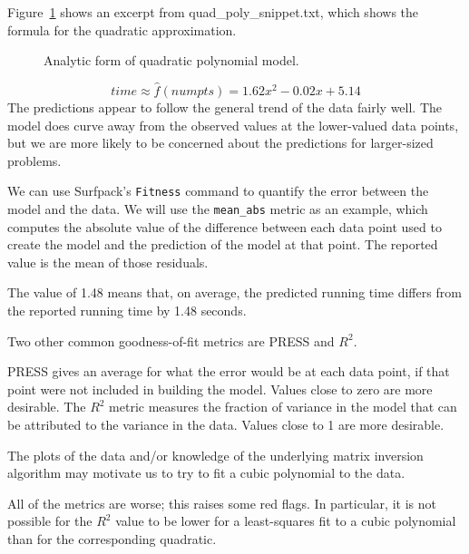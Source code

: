 \documentclass{article}
\begin{document}
Figure~\ref{fig:timing_poly2_extract} shows an excerpt from quad\_poly\_snippet.txt, which shows the
formula for the quadratic approximation.
\begin{figure}[htbp]
  \centering
  \begin{bigbox}
	\begin{small}
	
 	\end{small}
  \end{bigbox}
   \label{fig:timing_poly2_extract}
   \caption{ Analytic form of quadratic polynomial model. }
\end{figure}
\[ time \approx \hat{f}(numpts) = 1.62x^2 - 0.02x + 5.14 \]
The predictions appear to follow the general trend of the data fairly well.  The
model does curve away from the observed values at the lower-valued data points,
but we are more likely to be concerned about the predictions for larger-sized
problems.

We can use Surfpack's \texttt{Fitness} command to quantify the error between the model
and the data.  We will use the \texttt{mean\_abs} metric as an example, which computes
the absolute value of the difference between each data point used to create the
model and the prediction of the model at that point.  The reported value is the
mean of those residuals.


The value of 1.48 means that, on average, the predicted running time differs
from the reported running time by 1.48 seconds.  

Two other common goodness-of-fit metrics are PRESS and $R^2$.

PRESS gives an average for what the error would be at each data point, if that
point were not included in building the model.  Values close to zero are more
desirable.  The $R^2$ metric measures the fraction of variance in the model
that can be attributed to the variance in the data.  Values close to 1 are more
desirable.

The plots of the data and/or knowledge of the underlying matrix inversion
algorithm may motivate us to try to fit a cubic polynomial to the data.



All of the metrics are worse; this raises some red flags.  In particular, it is
not possible for the $R^2$ value to be lower for a least-squares fit to a
cubic polynomial than for the corresponding quadratic.
\end{document}
